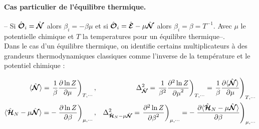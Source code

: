 \paragraph{Cas particulier de l’équilibre thermique.}
-- Si $\hat{\bm{\mathcal{O}}}_i = \hat{\bm{\mathcal{N}}}$ alors $\beta_i = - \beta \mu $ et si $\hat{\bm{\mathcal{O}}}_i = \hat{\bm{\mathcal{E}}} - \mu \hat{\bm{\mathcal{N}}} $ alors $\beta_i = \beta = T^{-1}$. Avec $\mu$ le potentielle chimique et $T$ la temperatures pour un équilibre thermique--.\\
Dans le cas d’un équilibre thermique, on identifie certains multiplicateurs à des grandeurs thermodynamiques classiques comme l’inverse de la température  et le potentiel chimique :
	

	
	
	

	
\begin{eqnarray}
	\langle \hat{\bm{\mathcal{N}}} \rangle  = \left .\frac{1}{\beta} \frac{ \partial \ln Z}{\partial \mu } \right )_{T,\cdots},  & & \Delta^2_{\hat{\bm{\mathcal{N}}}} = \left . \frac{1}{\beta^2} \frac{ \partial^2 \ln Z}{{\partial \mu}^2 } \right )_{T,\cdots} =  \left . \frac{1}{\beta} \frac{ \partial \langle \hat{\bm{\mathcal{N}}} \rangle}{\partial \mu } \right )_{T,\cdots}\\
	\langle \hat{\bm{\mathcal{H}}}_N - \mu\hat{\bm{\mathcal{N}}}  \rangle  = -\left . \frac{ \partial \ln Z}{\partial \beta } \right )_{\mu , \cdots} ,  & & \Delta^2_{\hat{\bm{\mathcal{H}}}_N - \mu\hat{\bm{\mathcal{N}}}} = \left .  \frac{ \partial^2 \ln Z}{{\partial \beta}^2 } \right )_{\mu , \cdots} =  -\left .  \frac{ \partial \langle \hat{\bm{\mathcal{H}}}_N - \mu\hat{\bm{\mathcal{N}}} \rangle}{\partial \beta } \right )_{\mu , \cdots}		
\end{eqnarray}


